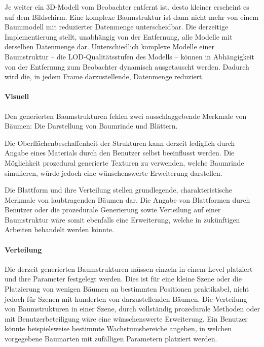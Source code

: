 Je weiter ein 3D-Modell vom Beobachter entfernt ist, desto kleiner erscheint es auf dem Bildschirm. Eine komplexe Baumstruktur ist dann nicht mehr von einem Baummodell mit reduzierter Datenmenge unterscheidbar. Die derzeitige Implementierung stellt, unabhängig von der Entfernung, alle Modelle mit derselben Datenmenge dar. Unterschiedlich komplexe Modelle einer Baumstruktur -- die LOD-Qualitätsstufen des Modells -- können in Abhängigkeit von der Entfernung zum Beobachter dynamisch ausgetauscht werden. Dadurch wird die, in jedem Frame darzustellende, Datenmenge reduziert. \cite[S.267]{Deussen:05}

\paragraph{Visuell}

Den generierten Baumstrukturen fehlen zwei ausschlaggebende Merkmale von Bäumen: Die Darstellung von Baumrinde und Blättern. 

Die Oberflächenbeschaffenheit der Strukturen kann derzeit lediglich durch Angabe eines Materials durch den Benutzer selbst beeinflusst werden. Die Möglichkeit prozedural generierte Texturen zu verwenden, welche Baumrinde simulieren, würde jedoch eine wünschenswerte Erweiterung darstellen. 

Die Blattform und ihre Verteilung stellen grundlegende, charakteristische Merkmale von laubtragenden Bäumen dar. Die Angabe von Blattformen durch Benutzer oder die prozedurale Generierung sowie Verteilung auf einer Baumstruktur wäre somit ebenfalls eine Erweiterung, welche in zukünftigen Arbeiten behandelt werden könnte.

\paragraph{Verteilung}

Die derzeit generierten Baumstrukturen müssen einzeln in einem Level platziert und ihre Parameter festgelegt werden. Dies ist für eine kleine Szene oder die Platzierung von wenigen Bäumen an bestimmten Positionen praktikabel, nicht jedoch für Szenen mit hunderten von darzustellenden Bäumen. Die Verteilung von Baumstrukturen in einer Szene, durch vollständig prozedurale Methoden oder mit Benutzerbeteiligung wäre eine wünschenswerte Erweiterung. Ein Benutzer könnte beispielsweise bestimmte Wachstumsbereiche angeben, in welchen vorgegebene Baumarten mit zufälligen Parametern platziert werden. 
